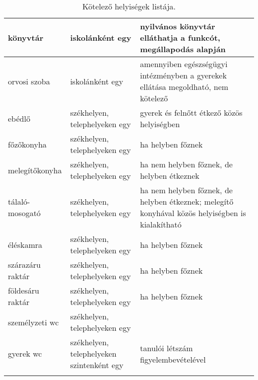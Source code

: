 \begin{longtable}{@{}p{4cm}|p{4cm}|p{6cm}@{}}
könyvtár               & iskolánként egy                           & nyilvános könyvtár elláthatja a funkcót, megállapodás alapján                                   \\ \hline
orvosi szoba           & iskolánként egy                           & amennyiben egészségügyi intézményben a gyerekek ellátása megoldható, nem kötelező    \\ \hline
ebédlő                 & székhelyen, telephelyeken egy             & gyerek és felnőtt étkező közös helyiségben                                                      \\ \hline
főzőkonyha             & székhelyen, telephelyeken egy             & ha helyben főznek                                                                               \\ \hline
melegítőkonyha         & székhelyen, telephelyeken egy             & ha nem helyben főznek, de helyben étkeznek                                                      \\ \hline
tálaló-mosogató        & székhelyen, telephelyeken egy             & ha nem helyben főznek, de helyben étkeznek; melegítő konyhával közös helyiségben is kialakítható \\ \hline
éléskamra              & székhelyen, telephelyeken egy             & ha helyben főznek                                                                               \\ \hline
szárazáru raktár       & székhelyen, telephelyeken egy             & ha helyben főznek                                                                               \\ \hline
földesáru raktár       & székhelyen, telephelyeken egy             & ha helyben főznek                                                                               \\ \hline
személyzeti wc         & székhelyen, telephelyeken egy             &                                                                                                 \\ \hline
gyerek wc              & székhelyen, telephelyeken szintenként egy & tanulói létszám figyelembevételével                                                            \\

\caption{Kötelező helyiségek listája.}
\label{tbl:helyisegek}

\end{longtable}
